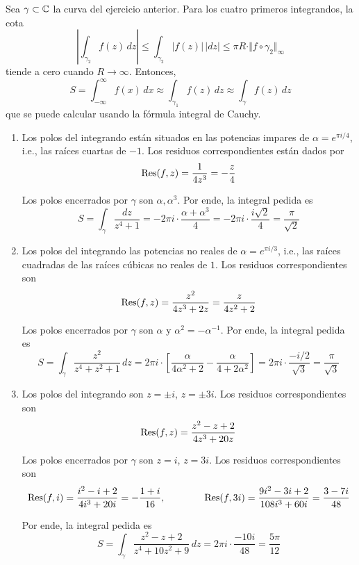 \begin{solution}
Sea $\gamma \subset \mathbb C$ la curva del ejercicio anterior. Para los cuatro primeros integrandos, la cota
$$
\left| \int_{\gamma_2} f(z) \, dz \right|
    \le \int_{\gamma_2} |f(z)| \, |dz|
    \le \pi R \cdot \Vert f \circ \gamma_2 \Vert_\infty
$$
tiende a cero cuando $R \to \infty$. Entonces,
$$
S
    = \int_{-\infty}^\infty f(x) \, dx
    \approx \int_{\gamma_1} f(z) \, dz
    \approx \int_\gamma f(z) \, dz
$$
que se puede calcular usando la fórmula integral de Cauchy.
\begin{enumerate}[label=(\alph*)]
    \item Los polos del integrando están situados en las potencias impares de $\alpha = e^{\pi i/4}$, i.e., las raíces cuartas de $-1$. Los residuos correspondientes están dados por
    $$\operatorname{Res}(f, z) = \frac 1 {4z^3} = -\frac z4$$
    
    Los polos encerrados por $\gamma$ son $\alpha, \alpha^3$. Por ende, la integral pedida es
    $$
    S
        = \int_\gamma \frac {dz} {z^4 + 1}
        = -2\pi i \cdot \frac {\alpha + \alpha^3} 4
        = -2\pi i \cdot \frac {i \sqrt 2} 4
        = \frac \pi {\sqrt 2}
    $$
    
    \item Los polos del integrando las potencias no reales de $\alpha = e^{\pi i/3}$, i.e., las raíces cuadradas de las raíces cúbicas no reales de $1$. Los residuos correspondientes son
    $$\operatorname{Res}(f, z) = \frac {z^2} {4z^3 + 2z} = \frac z {4z^2 + 2}$$
    
    Los polos encerrados por $\gamma$ son $\alpha$ y $\alpha^2 = -\alpha^{-1}$. Por ende, la integral pedida es
    $$
    S
        = \int_\gamma \frac {z^2} {z^4 + z^2 + 1} \, dz
        = 2\pi i \cdot \left[ \frac \alpha {4\alpha^2 + 2} - \frac \alpha {4 + 2\alpha^2} \right]
        = 2\pi i \cdot \frac {-i/2} {\sqrt 3}
        = \frac \pi {\sqrt 3}
    $$
    
    \item Los polos del integrando son $z = \pm i$, $z = \pm 3i$. Los residuos correspondientes son
    $$\operatorname{Res}(f, z) = \frac {z^2 - z + 2} {4z^3 + 20z}$$
    
    Los polos encerrados por $\gamma$ son $z = i$, $z = 3i$. Los residuos correspondientes son
    $$
    \operatorname{Res}(f, i) = \frac {i^2 - i + 2} {4i^3 + 20i} = -\frac {1 + i} {16}, \qquad \qquad
    \operatorname{Res}(f, 3i) = \frac {9i^2 - 3i + 2} {108i^3 + 60i} = \frac {3 - 7i} {48}
    $$
    
    Por ende, la integral pedida es
    $$
    S
        = \int_\gamma \frac {z^2 - z + 2} {z^4 + 10z^2 + 9} \, dz
        = 2\pi i \cdot \frac {-10i} {48}
        = \frac {5\pi} {12}
    $$
    

\end{enumerate}
\end{solution}
